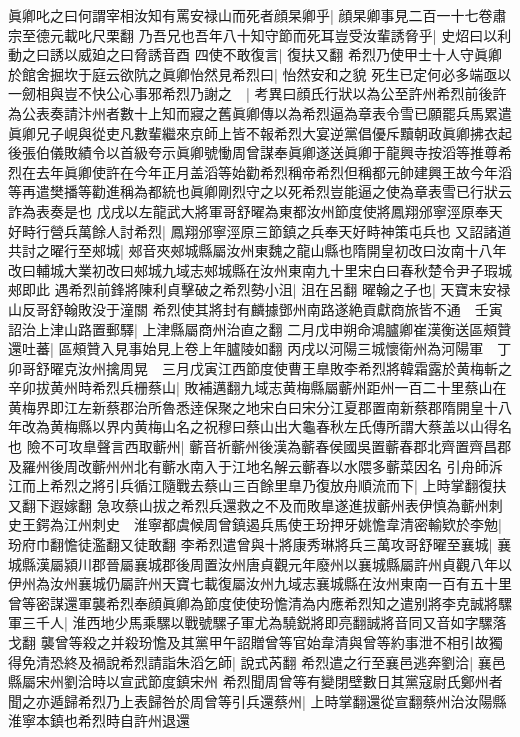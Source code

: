 眞卿叱之曰何謂宰相汝知有罵安禄山而死者顔杲卿乎|{
	顔杲卿事見二百一十七卷肅宗至德元載叱尺栗翻}
乃吾兄也吾年八十知守節而死耳豈受汝輩誘脅乎|{
	史炤曰以利動之曰誘以威廹之曰脅誘音酉}
四使不敢復言|{
	復扶又翻}
希烈乃使甲士十人守眞卿於館舍掘坎于庭云欲阬之眞卿怡然見希烈曰|{
	怡然安和之貌}
死生已定何必多端亟以一劒相與豈不快公心事邪希烈乃謝之　|{
	考異曰顔氏行狀以為公至許州希烈前後許為公表奏請汴州者數十上知而寢之舊眞卿傳以為希烈逼為章表令雪已願罷兵馬累遣眞卿兄子峴與從吏凡數輩繼來京師上皆不報希烈大宴逆黨倡優斥黷朝政眞卿拂衣起後張伯儀敗績令以首級夸示眞卿號慟周曾謀奉眞卿遂送眞卿于龍興寺按滔等推尊希烈在去年眞卿使許在今年正月盖滔等始勸希烈稱帝希烈但稱都元帥建興王故今年滔等再遣樊播等勸進稱為都統也眞卿剛烈守之以死希烈豈能逼之使為章表雪已行狀云詐為表奏是也}
戊戌以左龍武大將軍哥舒曜為東都汝州節度使將鳳翔邠寧涇原奉天好畤行營兵萬餘人討希烈|{
	鳳翔邠寧涇原三節鎮之兵奉天好畤神策屯兵也}
又詔諸道共討之曜行至郟城|{
	郟音夾郟城縣屬汝州東魏之龍山縣也隋開皇初改曰汝南十八年改曰輔城大業初改曰郟城九域志郟城縣在汝州東南九十里宋白曰春秋楚令尹子瑕城郟即此}
遇希烈前鋒將陳利貞擊破之希烈勢小沮|{
	沮在呂翻}
曜翰之子也|{
	天寶末安禄山反哥舒翰敗没于潼關}
希烈使其將封有麟據鄧州南路遂絶貢獻商旅皆不通　壬寅詔治上津山路置郵驛|{
	上津縣屬商州治直之翻}
二月戊申朔命鴻臚卿崔漢衡送區頰贊還吐蕃|{
	區頰贊入見事始見上卷上年臚陵如翻}
丙戌以河陽三城懷衛州為河陽軍　丁卯哥舒曜克汝州擒周晃　三月戊寅江西節度使曹王臯敗李希烈將韓霜露於黄梅斬之辛卯拔黄州時希烈兵栅蔡山|{
	敗補邁翻九域志黄梅縣屬蘄州距州一百二十里蔡山在黄梅界即江左新蔡郡治所魯悉逹保聚之地宋白曰宋分江夏郡置南新蔡郡隋開皇十八年改為黄梅縣以界内黄梅山名之祝穆曰蔡山出大龜春秋左氏傳所謂大蔡盖以山得名也}
險不可攻臯聲言西取蘄州|{
	蘄音祈蘄州後漢為蘄春侯國吳置蘄春郡北齊置齊昌郡及羅州後周改蘄州州北有蘄水南入于江地名解云蘄春以水隈多蘄菜因名}
引舟師泝江而上希烈之將引兵循江隨戰去蔡山三百餘里臯乃復放舟順流而下|{
	上時掌翻復扶又翻下遐嫁翻}
急攻蔡山拔之希烈兵還救之不及而敗臯遂進拔蘄州表伊慎為蘄州刺史王鍔為江州刺史　淮寧都虞候周曾鎮遏兵馬使王玢押牙姚憺韋清密輸欵於李勉|{
	玢府巾翻憺徒濫翻又徒敢翻}
李希烈遣曾與十將康秀琳將兵三萬攻哥舒曜至襄城|{
	襄城縣漢屬潁川郡晉屬襄城郡後周置汝州唐貞觀元年廢州以襄城縣屬許州貞觀八年以伊州為汝州襄城仍屬許州天寶七載復屬汝州九域志襄城縣在汝州東南一百有五十里}
曾等密謀還軍襲希烈奉顔眞卿為節度使使玢憺清為内應希烈知之遣别將李克誠將騾軍三千人|{
	淮西地少馬乘騾以戰號騾子軍尤為驍鋭將即亮翻誠將音同又音如字騾落戈翻}
襲曾等殺之并殺玢憺及其黨甲午詔贈曾等官始韋清與曾等約事泄不相引故獨得免清恐終及禍說希烈請詣朱滔乞師|{
	說式芮翻}
希烈遣之行至襄邑逃奔劉洽|{
	襄邑縣屬宋州劉洽時以宣武節度鎮宋州}
希烈聞周曾等有變閉壁數日其黨寇尉氏鄭州者聞之亦遁歸希烈乃上表歸咎於周曾等引兵還蔡州|{
	上時掌翻還從宣翻蔡州治汝陽縣淮寧本鎮也希烈時自許州退還}
